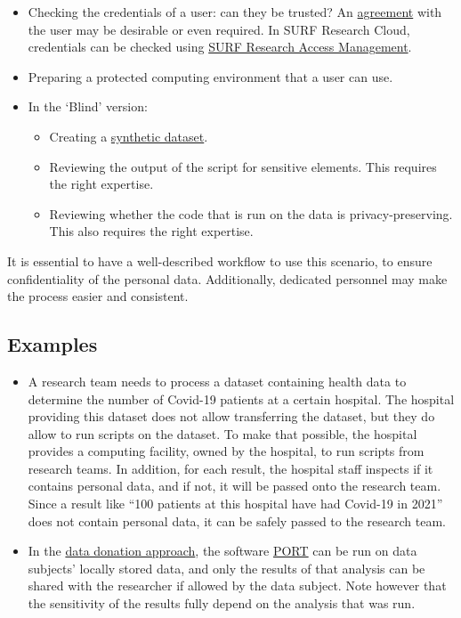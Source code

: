 \documentclass[
]{book}
\providecommand{\tightlist}{%
  \setlength{\itemsep}{0pt}\setlength{\parskip}{0pt}}
\begin{document}
\begin{itemize}
\tightlist
\item
  Checking the credentials of a user: can they be trusted? An
  \protect\hyperlink{agreements}{agreement} with the user may be desirable or even required. In
  SURF Research Cloud, credentials can be checked using
  \href{https://www.surf.nl/en/surf-research-access-management-easy-and-secure-access-to-research-services}{SURF Research Access Management}.
\item
  Preparing a protected computing environment that a user can use.
\item
  In the `Blind' version:

  \begin{itemize}
  \tightlist
  \item
    Creating a \protect\hyperlink{synthetic-data}{synthetic dataset}.
  \item
    Reviewing the output of the script for sensitive elements. This requires
    the right expertise.
  \item
    Reviewing whether the code that is run on the data is privacy-preserving.
    This also requires the right expertise.
  \end{itemize}
\end{itemize}

It is essential to have a well-described workflow to use this scenario, to
ensure confidentiality of the personal data. Additionally, dedicated personnel
may make the process easier and consistent.

\hypertarget{examples-1}{%
\subsection{Examples}\label{examples-1}}

\begin{itemize}
\tightlist
\item
  A research team needs to process a dataset containing health data to determine
  the number of Covid-19 patients at a certain hospital. The hospital providing
  this dataset does not allow transferring the dataset, but they do allow to run
  scripts on the dataset. To make that possible, the hospital provides a computing
  facility, owned by the hospital, to run scripts from research teams. In addition,
  for each result, the hospital staff inspects if it contains personal data, and
  if not, it will be passed onto the research team. Since a result like ``100
  patients at this hospital have had Covid-19 in 2021'' does not contain personal
  data, it can be safely passed to the research team.
\item
  In the \protect\hyperlink{data-donation}{data donation approach}, the software
  \href{https://github.com/eyra/port}{PORT} can be run on data
  subjects' locally stored data, and only the results of that analysis can be
  shared with the researcher if allowed by the data subject. Note however that the
  sensitivity of the results fully depend on the analysis that was run.
\end{itemize}
\end{document}
